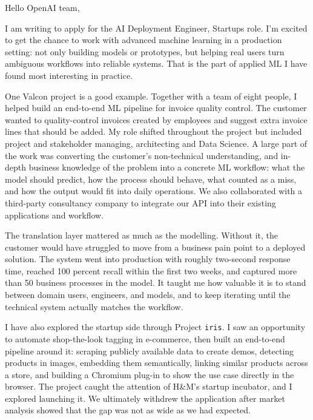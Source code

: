 \documentclass[11pt,a4paper]{moderncv}
\begin{document}
\makecvtitle
Hello OpenAI team,

\vspace*{2em}
I am writing to apply for the AI Deployment Engineer, Startups role. I'm excited to get the chance to work with advanced machine learning in a production setting: not only building models or prototypes, but helping real users turn ambiguous workflows into reliable systems. That is the part of applied ML I have found most interesting in practice.

\hspace*{2em}
One Valcon project is a good example. Together with a team of eight people, I helped build an end-to-end ML pipeline for invoice quality control. The customer wanted to quality-control invoices created by employees and suggest extra invoice lines that should be added. My role shifted throughout the project but included project and stakeholder managing, architecting and Data Science. A large part of the work was converting the customer's non-technical understanding, and in-depth business knowledge of the problem into a concrete ML workflow: what the model should predict, how the process should behave, what counted as a miss, and how the output would fit into daily operations. We also collaborated with a third-party consultancy company to integrate our API into their existing applications and workflow.

\hspace*{2em}
The translation layer mattered as much as the modelling. Without it, the customer would have struggled to move from a business pain point to a deployed solution. The system went into production with roughly two-second response time, reached 100 percent recall within the first two weeks, and captured more than 50 business processes in the model. It taught me how valuable it is to stand between domain users, engineers, and models, and to keep iterating until the technical system actually matches the workflow.

\hspace*{2em}
I have also explored the startup side through Project \texttt{iris}. I saw an opportunity to automate shop-the-look tagging in e-commerce, then built an end-to-end pipeline around it: scraping publicly available data to create demos, detecting products in images, embedding them semantically, linking similar products across a store, and building a Chromium plug-in to show the use case directly in the browser. The project caught the attention of H\&M's startup incubator, and I explored launching it. We ultimately withdrew the application after market analysis showed that the gap was not as wide as we had expected.
\end{document}
